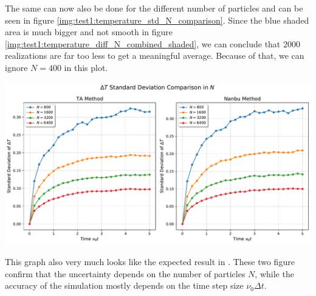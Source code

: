 The same can now also be done for the different number of particles and can be seen in figure \ref{img:test1:temperature_std_N_comparison}. Since the blue shaded area is much bigger and not smooth in figure \ref{img:test1:temperature_diff_N_combined_shaded}, we can conclude that $2000$ realizations are far too less to get a meaningful average. Because of that, we can ignore $N = 400$ in this plot. \\
\begin{minipage}[h]{\linewidth}
    \vspace{5pt}
    \centering
    \includegraphics[width=\linewidth]{ressources/test1/temperature_std_N_comparison.pdf}
    \label{img:test1:temperature_std_N_comparison}
    \vspace{5pt}
\end{minipage}
This graph also very much looks like the expected result in \cite[4320]{Wang2008}. These two figure confirm that the uncertainty depends on the number of particles $N$, while the accuracy of the simulation mostly depends on the time step size $\nu_0 \Delta t$. 




